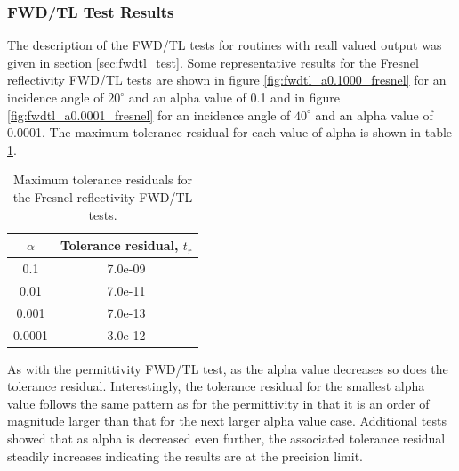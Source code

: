 \subsubsection{FWD/TL Test Results}
The description of the FWD/TL tests for routines with reall valued output was given in section \ref{sec:fwdtl_test}. Some representative results for the Fresnel reflectivity FWD/TL tests are shown in figure \ref{fig:fwdtl_a0.1000_fresnel} for an incidence angle of $20^{\circ}$ and an alpha value of 0.1 and in figure \ref{fig:fwdtl_a0.0001_fresnel} for an incidence angle of $40^{\circ}$ and an alpha value of 0.0001. The maximum tolerance residual for each value of alpha is shown in table \ref{tab:fwdtl_fresnel_alpha}.
\begin{table}[htp]
  \centering
  \begin{tabular}{| c | c |}
    \hline
    \boldmath$\alpha$\unboldmath & \textbf{Tolerance residual,} \boldmath$t_r$\unboldmath \\
    \hline\hline
    0.1    & 7.0e-09 \\
    0.01   & 7.0e-11 \\
    0.001  & 7.0e-13 \\
    0.0001 & 3.0e-12 \\
    \hline
  \end{tabular}
  \caption{Maximum tolerance residuals for the Fresnel reflectivity FWD/TL tests.}
  \label{tab:fwdtl_fresnel_alpha}
\end{table}
As with the permittivity FWD/TL test, as the alpha value decreases so does the tolerance residual. Interestingly, the tolerance residual for the smallest alpha value follows the same pattern as for the permittivity in that it is an order of magnitude larger than that for the next larger alpha value case. Additional tests showed that as alpha is decreased even further, the associated tolerance residual steadily increases indicating the results are at the precision limit.

